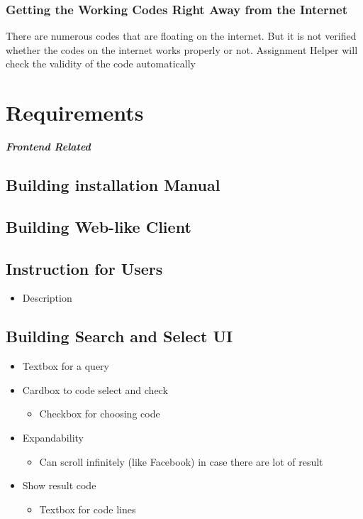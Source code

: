 \documentclass[conference]{IEEEtran}
\begin{document}
\subsubsection{Getting the Working Codes Right Away from the Internet}
There are numerous codes that are floating on the internet. But it is not verified whether the codes on the internet works properly or not. Assignment Helper will check the validity of the code automatically 


\section{Requirements} %
\label{sec:requirements}


\textit{\textbf{Frontend Related}}

\subsection{Building installation Manual}
\textit{ }

\subsection{Building Web-like Client}
\textit{ }

\subsection{Instruction for Users}
\begin{itemize}
  \item Description
\end{itemize}
\textit{ }

\subsection{Building Search and Select UI}
\begin{itemize}
  \item Textbox for a query
  \item Cardbox to code select and check
  \begin{itemize}
    \item Checkbox for choosing code
  \end{itemize}
  \item Expandability
  \begin{itemize}
    \item Can scroll infinitely (like Facebook) in case there are lot of result
  \end{itemize}
  \item Show result code
  \begin{itemize}
    \item Textbox for code lines
  \end{itemize}
\end{itemize}
\textit{ }
\end{document}
